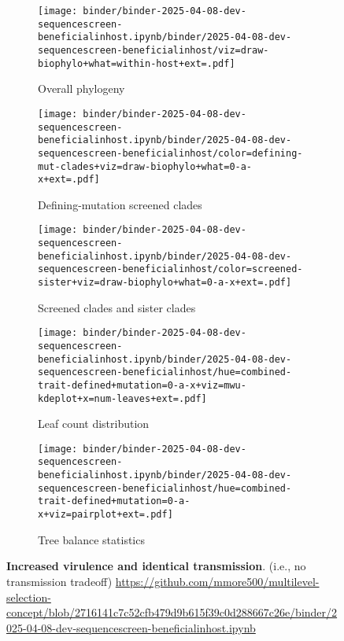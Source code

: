 \begin{figure*}[htbp]
  \centering
  \begin{subfigure}{0.32\textwidth}
    \centering
    \texttt{[image: binder/binder-2025-04-08-dev-sequencescreen-beneficialinhost.ipynb/binder/2025-04-08-dev-sequencescreen-beneficialinhost/viz=draw-biophylo+what=within-host+ext=.pdf]}
    \caption{Overall phylogeny}
    \label{fig:dev-sequencescreen-beneficialinhost:overall_phylogeny}
  \end{subfigure}
  \hfill
  \begin{subfigure}{0.32\textwidth}
    \centering
    \texttt{[image: binder/binder-2025-04-08-dev-sequencescreen-beneficialinhost.ipynb/binder/2025-04-08-dev-sequencescreen-beneficialinhost/color=defining-mut-clades+viz=draw-biophylo+what=0-a-x+ext=.pdf]}
    \caption{Defining-mutation screened clades}
    \label{fig:dev-sequencescreen-beneficialinhost:defining_mut_clades}
  \end{subfigure}
  \hfill
  \begin{subfigure}{0.32\textwidth}
    \centering
    \texttt{[image: binder/binder-2025-04-08-dev-sequencescreen-beneficialinhost.ipynb/binder/2025-04-08-dev-sequencescreen-beneficialinhost/color=screened-sister+viz=draw-biophylo+what=0-a-x+ext=.pdf]}
    \caption{Screened clades and sister clades}
    \label{fig:dev-sequencescreen-beneficialinhost:screened_sister}
  \end{subfigure}

  \vspace{0.5cm} %

  \begin{subfigure}{0.54\textwidth}
    \centering
    \texttt{[image: binder/binder-2025-04-08-dev-sequencescreen-beneficialinhost.ipynb/binder/2025-04-08-dev-sequencescreen-beneficialinhost/hue=combined-trait-defined+mutation=0-a-x+viz=mwu-kdeplot+x=num-leaves+ext=.pdf]}
    \caption{Leaf count distribution}
    \label{fig:dev-sequencescreen-beneficialinhost:leaf_count}
  \end{subfigure}
  \hfill
  \begin{subfigure}{0.44\textwidth}
    \centering
    \texttt{[image: binder/binder-2025-04-08-dev-sequencescreen-beneficialinhost.ipynb/binder/2025-04-08-dev-sequencescreen-beneficialinhost/hue=combined-trait-defined+mutation=0-a-x+viz=pairplot+ext=.pdf]}
    \caption{Tree balance statistics}
    \label{fig:dev-sequencescreen-beneficialinhost:tree_balance}
  \end{subfigure}

  \caption{\textbf{Increased virulence and identical transmission}. (i.e., no transmission tradeoff) \url{https://github.com/mmore500/multilevel-selection-concept/blob/2716141c7c52cfb479d9b615f39c0d288667c26e/binder/2025-04-08-dev-sequencescreen-beneficialinhost.ipynb}}
  \label{fig:dev-sequencescreen-beneficialinhost}
\end{figure*}
